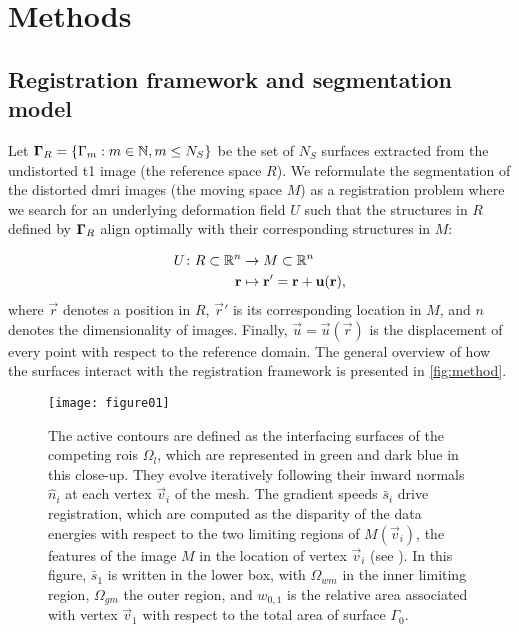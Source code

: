 \section{Methods}\label{sec:methods}

\subsection{Registration framework and segmentation model}\label{sec:methods_map}
Let $\boldsymbol{\Gamma}_R = \{\Gamma_m: m \in \mathbb{N}, m \leq N_S\}$ be the set of $N_S$ surfaces
  extracted from the undistorted \gls*{t1} image (the reference space $R$).
We reformulate the segmentation of the distorted \gls*{dmri} images (the moving space $M$)
  as a registration problem where we search for an underlying deformation field $U$ such that
  the structures in $R$ defined by $\boldsymbol{\Gamma}_R$ align optimally with their corresponding
  structures in $M$:

  \begin{align}
  U\colon R \subset \mathbb{R}^n &\to M \subset \mathbb{R}^n \notag\\
  \vec{r} &\mapsto \vec{r}' =\vec{r}+\vec{u}(\vec{r}),
  \label{eq:transform}
  \end{align}
  where $\vec{r}$ denotes a position in $R$, $\vec{r}'$ is
  its corresponding location in $M$, and $n$ denotes the dimensionality of images.
Finally, $\vec{u} = \vec{u}(\vec{r})$ is the displacement of every point with respect
  to the reference domain.
The general overview of how the surfaces interact with the registration framework
  is presented in \autoref{fig:method}.

\begin{figure}
  \texttt{[image: figure01]}
  \caption{The active contours are defined as the interfacing surfaces of the competing
    \glspl{roi} $\Omega_l$, which
  are represented in green and dark blue in this close-up.
  They evolve iteratively following their inward normals $\hat{n}_i$ at each vertex
    $\vec{v}_i$ of the mesh.
  The gradient speeds $\bar{s}_i$ drive registration, which are computed as the disparity of the data
    energies with respect to the two limiting regions of $M(\vec{v}_i)$, the features of the image
    $M$ in the location of vertex $\vec{v}_i$ (see ).
  In this figure, $\bar{s}_1$ is written in the lower
    box, with $\Omega_{wm}$ in the inner limiting region, $\Omega_{gm}$ the outer region, and
    $w_{0,1}$ is the relative area associated with vertex $\vec{v}_1$ with respect to
    the total area of surface $\Gamma_0$.
      }\label{fig:method}
\end{figure}

